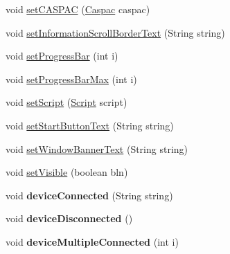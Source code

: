 \begin{DoxyCompactItemize}
\item 
void \hyperlink{classcom_1_1casual__dev_1_1zodui_1_1_c_a_s_u_a_l_zod_main_u_i_ab12d68b628844f24921b96641da9f0d4}{set\-C\-A\-S\-P\-A\-C} (\hyperlink{class_c_a_s_u_a_l_1_1caspac_1_1_caspac}{Caspac} caspac)
\item 
void \hyperlink{classcom_1_1casual__dev_1_1zodui_1_1_c_a_s_u_a_l_zod_main_u_i_a24e55cc0a9aae45ba3c677c16dcb9a05}{set\-Information\-Scroll\-Border\-Text} (String string)
\item 
void \hyperlink{classcom_1_1casual__dev_1_1zodui_1_1_c_a_s_u_a_l_zod_main_u_i_a0c0681aca1ee6801fd943f4d3064ef97}{set\-Progress\-Bar} (int i)
\item 
void \hyperlink{classcom_1_1casual__dev_1_1zodui_1_1_c_a_s_u_a_l_zod_main_u_i_ab7f0d7023606e06922ba170bea187609}{set\-Progress\-Bar\-Max} (int i)
\item 
void \hyperlink{classcom_1_1casual__dev_1_1zodui_1_1_c_a_s_u_a_l_zod_main_u_i_a51aa48049915bb55a5349a888453d8b6}{set\-Script} (\hyperlink{class_c_a_s_u_a_l_1_1caspac_1_1_script}{Script} script)
\item 
void \hyperlink{classcom_1_1casual__dev_1_1zodui_1_1_c_a_s_u_a_l_zod_main_u_i_a2cbed8aaf5e8fa288c5ff203ee301e41}{set\-Start\-Button\-Text} (String string)
\item 
void \hyperlink{classcom_1_1casual__dev_1_1zodui_1_1_c_a_s_u_a_l_zod_main_u_i_aa942073371f9cf93d7282fd3ed6b1733}{set\-Window\-Banner\-Text} (String string)
\item 
void \hyperlink{classcom_1_1casual__dev_1_1zodui_1_1_c_a_s_u_a_l_zod_main_u_i_a5821ae829a82917b2d0bad84f5614e36}{set\-Visible} (boolean bln)
\item 
\hypertarget{classcom_1_1casual__dev_1_1zodui_1_1_c_a_s_u_a_l_zod_main_u_i_a801505a01e60b1f075b05a50842b911e}{void {\bfseries device\-Connected} (String string)}\label{classcom_1_1casual__dev_1_1zodui_1_1_c_a_s_u_a_l_zod_main_u_i_a801505a01e60b1f075b05a50842b911e}

\item 
\hypertarget{classcom_1_1casual__dev_1_1zodui_1_1_c_a_s_u_a_l_zod_main_u_i_ab4b5bdca2390238b3072bbc81888c4dc}{void {\bfseries device\-Disconnected} ()}\label{classcom_1_1casual__dev_1_1zodui_1_1_c_a_s_u_a_l_zod_main_u_i_ab4b5bdca2390238b3072bbc81888c4dc}

\item 
\hypertarget{classcom_1_1casual__dev_1_1zodui_1_1_c_a_s_u_a_l_zod_main_u_i_a33ceed03a7731db7597f7369d37da41b}{void {\bfseries device\-Multiple\-Connected} (int i)}\label{classcom_1_1casual__dev_1_1zodui_1_1_c_a_s_u_a_l_zod_main_u_i_a33ceed03a7731db7597f7369d37da41b}


\end{DoxyCompactItemize}
